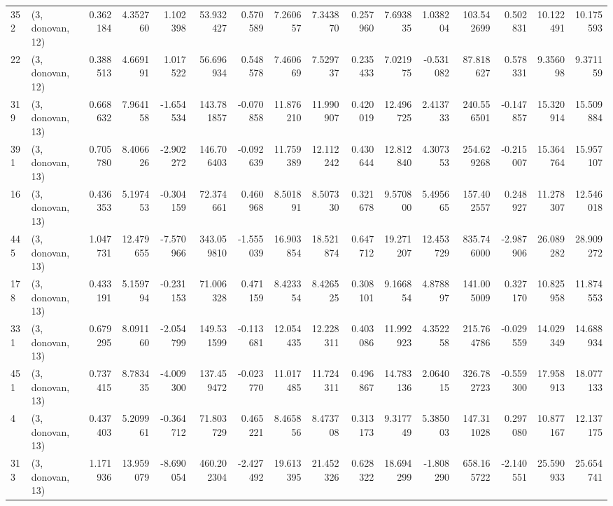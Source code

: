 \begin{tabular}{llrrrrrrrrrrrrrr}
352 &  (3, donovan, 12) &   0.362184 &   4.352760 &   1.102398 &    53.932427 &   0.570589 &   7.260657 &   7.343870 &  0.257960 &   7.693835 &   1.038204 &   103.542699 &  0.502831 &  10.122491 &  10.175593 \\
22  &  (3, donovan, 12) &   0.388513 &   4.669191 &   1.017522 &    56.696934 &   0.548578 &   7.460669 &   7.529737 &  0.235433 &   7.021975 &  -0.531082 &    87.818627 &  0.578331 &   9.356098 &   9.371159 \\
319 &  (3, donovan, 13) &   0.668632 &   7.964158 &  -1.654534 &   143.781857 &  -0.070858 &  11.876210 &  11.990907 &  0.420019 &  12.496725 &   2.413733 &   240.556501 & -0.147857 &  15.320914 &  15.509884 \\
391 &  (3, donovan, 13) &   0.705780 &   8.406626 &  -2.902272 &   146.706403 &  -0.092639 &  11.759389 &  12.112242 &  0.430644 &  12.812840 &   4.307353 &   254.629268 & -0.215007 &  15.364764 &  15.957107 \\
16  &  (3, donovan, 13) &   0.436353 &   5.197453 &  -0.304159 &    72.374661 &   0.460968 &   8.501891 &   8.507330 &  0.321678 &   9.570800 &   5.495665 &   157.402557 &  0.248927 &  11.278307 &  12.546018 \\
445 &  (3, donovan, 13) &   1.047731 &  12.479655 &  -7.570966 &   343.059810 &  -1.555039 &  16.903854 &  18.521874 &  0.647712 &  19.271207 &  12.453729 &   835.746000 & -2.987906 &  26.089282 &  28.909272 \\
178 &  (3, donovan, 13) &   0.433191 &   5.159794 &  -0.231153 &    71.006328 &   0.471159 &   8.423354 &   8.426525 &  0.308101 &   9.166854 &   4.878897 &   141.005009 &  0.327170 &  10.825958 &  11.874553 \\
331 &  (3, donovan, 13) &   0.679295 &   8.091160 &  -2.054799 &   149.531599 &  -0.113681 &  12.054435 &  12.228311 &  0.403086 &  11.992923 &   4.352258 &   215.764786 & -0.029559 &  14.029349 &  14.688934 \\
451 &  (3, donovan, 13) &   0.737415 &   8.783435 &  -4.009300 &   137.459472 &  -0.023770 &  11.017485 &  11.724311 &  0.496867 &  14.783136 &   2.064015 &   326.782723 & -0.559300 &  17.958913 &  18.077133 \\
4   &  (3, donovan, 13) &   0.437403 &   5.209961 &  -0.364712 &    71.803729 &   0.465221 &   8.465856 &   8.473708 &  0.313173 &   9.317749 &   5.385003 &   147.311028 &  0.297080 &  10.877167 &  12.137175 \\
313 &  (3, donovan, 13) &   1.171936 &  13.959079 &  -8.690054 &   460.202304 &  -2.427492 &  19.613395 &  21.452326 &  0.628322 &  18.694299 &  -1.808290 &   658.165722 & -2.140551 &  25.590933 &  25.654741 \\

\end{tabular}
